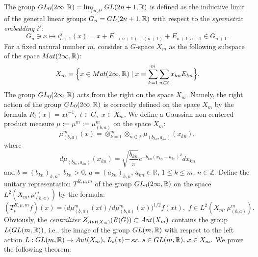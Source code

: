 \documentclass[preprint,12pt]{elsarticle}
\numberwithin{equation}{section}
\begin{document}
%
%
The group ${\rm GL}_0(2\infty,{\mathbb R})=\varinjlim_{n,i^s}{\rm
GL}(2n+1,{\mathbb R})$ is defined as the inductive limit of the
general linear groups $G_n={\rm GL}(2n+1,{\mathbb R})$ with
respect to the {\it symmetric embedding} $i^s$:
\begin{equation}
\label{N.i^s} 
G_n\ni x\mapsto
i^s_{n+1}(x)=x+E_{-(n+1),-(n+1)}+E_{n+1,n+1}\in %
G_{n+1}.
\end{equation}
For a fixed natural number $m$, consider a $G$-space $X_m$  as the
following subspace of the space ${\rm Mat}(2\infty,{\mathbb R})$:
%
\begin{equation}
\label{5.X_m} X_m=\Big\{x\in {\rm Mat}(2\infty,{\mathbb
R})\mid x=\sum_{k=1}^m\sum_{n\in{\mathbb
Z}}x_{kn}E_{kn}\Big\}.
\end{equation}
%
The  group ${\rm GL}_0(2\infty,{\mathbb R})$ acts from the right
on the space $X_m.$ Namely, the right action of the group ${\rm
GL}_0(2\infty,{\mathbb R})$ is correctly defined on the space
$X_m$ by the formula $R_t(x)=xt^{-1},\,\,t\in G,\,\,x\in X_m$. We
define a Gaussian non-centered product measure
$\mu:=\mu^m:=\mu_{(b,a)}^m$
on the space $X_m:$
\begin{equation}
\label{5.mu^m}
\mu_{(b,a)}^m(x)=\otimes_{k=1}^m\otimes_{n\in{\mathbb
Z}}\mu_{(b_{kn},a_{kn})}(x_{kn}),
\end{equation}
 where
\begin{equation}
\label{mu(b,a)} 
d\mu_{(b_{kn},a_{kn})}(x_{kn})=\sqrt{\frac{ b_{kn}}{\pi}}e^{-b_{kn}(x_{kn}-a_{kn})^2}
dx_{kn}
\end{equation}
and $b=(b_{kn})_{k,n},\,\,b_{kn}>0,\,a=(a_{kn})_{k,n},\,a_{kn}\in
{\mathbb R},\,1\leq k\leq m,\,n\in {\mathbb Z}.$ Define the unitary 
representation $T^{R,\mu,m}$ of the group ${\rm
GL}_0(2\infty,{\mathbb R})$ on the space $L^2(X_m,\mu^m_{(b,a)})$
by the formula:
\begin{equation}
\label{T^(R,mu,m)}
(T^{R,\mu,m}_tf)(x)=\big(d\mu_{(b,a)}^m(xt)/d\mu_{(b,a)}^m(x)\big)^{1/2}f(xt),\,\,f\in L^2(X_m,\mu^m_{(b,a)}).
\end{equation}
Obviously, the {\it centralizer} $Z_{{\rm Aut}(X_m)}(R(G))\subset
{\rm Aut}(X_m)$ contains  the group $L({\rm GL}(m,{\mathbb R}))$,
i.e., the image of the group ${\rm GL}(m,{\mathbb R})$ with
respect to the left action $L:{\rm GL}(m,{\mathbb R})\rightarrow
{\rm Aut}(X_m),\,L_s(x)\!=\!sx,\,s\in {\rm GL}(m,{\mathbb
R}),\,x\in X_m.$  We prove the following theorem.  
\end{document}
